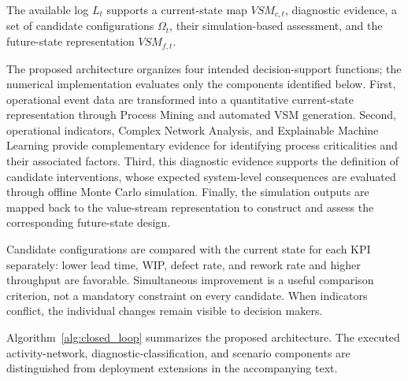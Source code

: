 \documentclass[pdflatex,iicol,Numbered,sn-basic]{sn-jnl}
\begin{document}
The available log \(L_t\) supports a current-state map \(VSM_{c,t}\), diagnostic evidence, a set of candidate configurations \(\Omega_t\), their simulation-based assessment, and the future-state representation \(VSM_{f,t}\).

The proposed architecture organizes four intended decision-support functions; the numerical implementation evaluates only the components identified below.
First, operational event data are transformed into a quantitative
current-state representation through Process Mining and automated VSM
generation. Second, operational indicators, Complex Network Analysis, and
Explainable Machine Learning provide complementary evidence for identifying
process criticalities and their associated factors. Third, this diagnostic
evidence supports the definition of candidate interventions, whose expected
system-level consequences are evaluated through offline Monte Carlo simulation.
Finally, the simulation outputs are mapped back to the value-stream
representation to construct and assess the corresponding future-state design.

Candidate configurations are compared with the current state for each KPI separately: lower lead time, WIP, defect rate, and rework rate and higher throughput are favorable. Simultaneous improvement is a useful comparison criterion, not a mandatory constraint on every candidate. When indicators conflict, the individual changes remain visible to decision makers.

Algorithm~\ref{alg:closed_loop} summarizes the proposed architecture. The executed activity-network, diagnostic-classification, and scenario components are distinguished from deployment extensions in the accompanying text.
\end{document}
